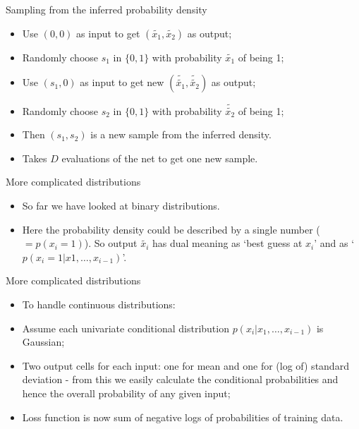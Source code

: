 \documentclass[usenames,dvipsnames]{beamer}
\begin{document}
\begin{frame}{Sampling from the inferred probability density}
    \begin{itemize}
      \item{Use $(0, 0)$ as input to get $(\tilde{x_1}, \tilde{x_2})$ as output;}
	\item{Randomly choose $s_1$ in $\{0, 1\}$ with probability $\tilde{x_1}$ of being 1;}
	\item{Use $(s_1, 0)$ as input to get new $(\tilde{\tilde{x_1}}, \tilde{\tilde{x_2}})$ as output;}
	\item{Randomly choose $s_2$ in $\{0, 1\}$ with probability $\tilde{\tilde{x_2}}$ of being 1;}
	\item{Then $(s_1, s_2)$ is a new sample from the inferred density.}
	\item{Takes $D$ evaluations of the net to get one new sample.}
    \end{itemize}
\end{frame}


\begin{frame}{More complicated distributions}
    \begin{itemize}
      \item{So far we have looked at binary distributions.}
	\item{Here the probability density could be described by a single number ($= p(x_i = 1)$). So output $\tilde{x_i}$ has dual meaning as `best guess at $x_i$' and as `$p(x_i = 1 | x1, \dots, x_{i-1})$'.}
    \end{itemize}
\end{frame}

\begin{frame}{More complicated distributions}
    \begin{itemize}
      \item{To handle continuous distributions:}
	\item{Assume each univariate conditional distribution $p(x_i | x_1, \dots, x_{i-1})$ is Gaussian;}
	\item{Two output cells for each input: one for mean and one for (log of) standard deviation - from this we easily calculate the conditional probabilities and hence the overall probability of any given input;}
	\item{Loss function is now sum of negative logs of probabilities of training data.}
    \end{itemize}
\end{frame}
\end{document}
